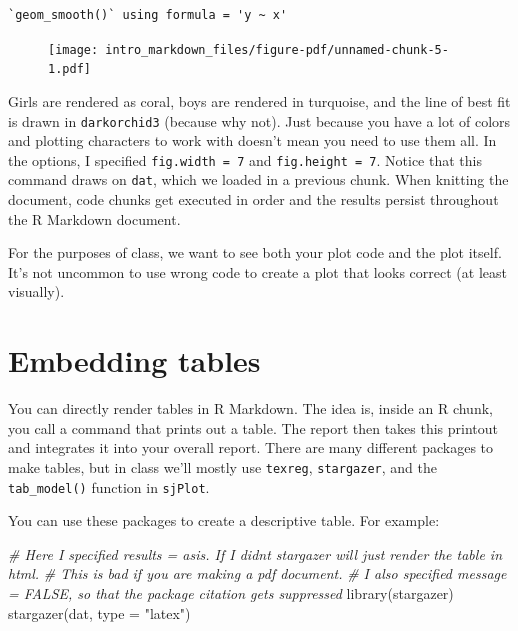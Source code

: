 \documentclass[
  letterpaper,
  DIV=11,
  numbers=noendperiod]{scrreprt}
\newenvironment{Shaded}{\begin{snugshade}}{\end{snugshade}}
\newcommand{\AttributeTok}[1]{\textcolor[rgb]{0.49,0.56,0.16}{#1}}
\newcommand{\CommentTok}[1]{\textcolor[rgb]{0.38,0.63,0.69}{\textit{#1}}}
\newcommand{\FunctionTok}[1]{\textcolor[rgb]{0.02,0.16,0.49}{#1}}
\newcommand{\NormalTok}[1]{\textcolor[rgb]{0.00,0.44,0.13}{#1}}
\newcommand{\StringTok}[1]{\textcolor[rgb]{0.25,0.44,0.63}{#1}}
\begin{document}
\begin{verbatim}
`geom_smooth()` using formula = 'y ~ x'
\end{verbatim}

\begin{figure}[H]

{\centering \texttt{[image: intro\_markdown\_files/figure-pdf/unnamed-chunk-5-1.pdf]}

}

\end{figure}

Girls are rendered as coral, boys are rendered in turquoise, and the
line of best fit is drawn in \texttt{darkorchid3} (because why not).
Just because you have a lot of colors and plotting characters to work
with doesn't mean you need to use them all. In the options, I specified
\texttt{fig.width\ =\ 7} and \texttt{fig.height\ =\ 7}. Notice that this
command draws on \texttt{dat}, which we loaded in a previous chunk. When
knitting the document, code chunks get executed in order and the results
persist throughout the R Markdown document.

For the purposes of class, we want to see both your plot code and the
plot itself. It's not uncommon to use wrong code to create a plot that
looks correct (at least visually).

\hypertarget{embedding-tables}{%
\section{Embedding tables}\label{embedding-tables}}

You can directly render tables in R Markdown. The idea is, inside an R
chunk, you call a command that prints out a table. The report then takes
this printout and integrates it into your overall report. There are many
different packages to make tables, but in class we'll mostly use
\texttt{texreg}, \texttt{stargazer}, and the \texttt{tab\_model()}
function in \texttt{sjPlot}.

You can use these packages to create a descriptive table. For example:

\begin{Shaded}
\begin{Highlighting}[]
\CommentTok{\# Here I specified results = asis. If I didn\textquotesingle{}t stargazer will just render the table in html.}
\CommentTok{\# This is bad if you are making a pdf document.}
\CommentTok{\# I also specified message = FALSE, so that the package citation gets suppressed}
\FunctionTok{library}\NormalTok{(stargazer)}
\FunctionTok{stargazer}\NormalTok{(dat, }\AttributeTok{type =} \StringTok{"latex"}\NormalTok{)}
\end{Highlighting}
\end{Shaded}
\end{document}
